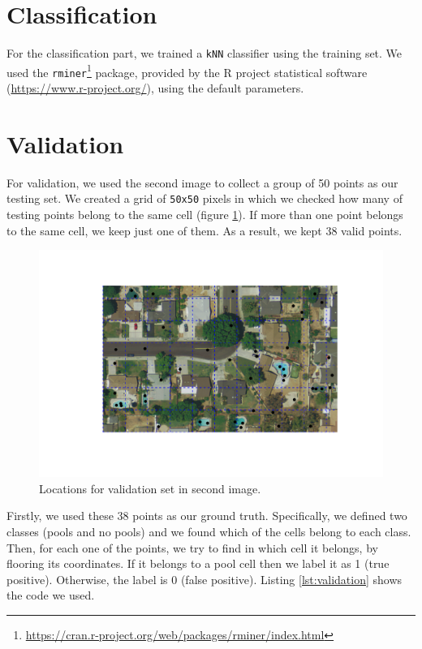 \documentclass{article}
\begin{document}
\FloatBarrier

\section{Classification}\label{sec:class}
For the classification part, we trained a \texttt{kNN} classifier using the training set.  We used the \texttt{rminer}\footnote{\url{https://cran.r-project.org/web/packages/rminer/index.html}} package, provided by the R project statistical software (\url{https://www.r-project.org/}), using the default parameters. 

\section{Validation}
For validation, we used the second image to collect a group of 50 points as our testing set. We created a grid of \texttt{50x50} pixels in which we checked how many of testing points belong to the same cell (figure \ref{fig:locations}). If more than one point belongs to the same cell, we keep just one of them. As a result, we kept 38 valid points. 

\begin{figure}
 \centering
 \includegraphics[trim=80 60 70 50 , clip, width=1\textwidth]{../figures/grid3.pdf}
 \caption{Locations for validation set in second image.}
 \label{fig:locations}
\end{figure}

Firstly, we used these 38 points as our ground truth. Specifically, we defined two classes (pools and no pools) and we found which of the cells belong to each class. Then, for each one of the points, we try to find in which cell it belongs, by flooring its coordinates. If it belongs to a pool cell then we label it as 1 (true positive). Otherwise, the label is 0 (false positive).  Listing \ref{lst:validation} shows the code we used. 
\end{document}
